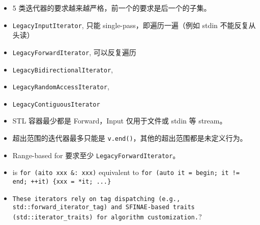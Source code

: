 
\begin{itemize}
\item 5 类迭代器的要求越来越严格，前一个的要求是后一个的子集。
\item \verb`LegacyInputIterator`, 只能 single-pass，即遍历一遍（例如 stdin 不能反复从头读）
\item \verb`LegacyForwardIterator`, 可以反复遍历
\item \verb`LegacyBidirectionalIterator`,
\item \verb`LegacyRandomAccessIterator`,
\item \verb`LegacyContiguousIterator`
\item STL 容器最少都是 Forward，Input 仅用于文件或 stdin 等 stream。
\item 超出范围的迭代器最多只能是 \verb`v.end()`，其他的超出范围都是未定义行为。
\item Range-based for 要求至少 \verb`LegacyForwardIterator`。
\item is \verb`for (aito xxx &: xxx)` equivalent to \verb`for (auto it = begin; it != end; ++it) {xxx = *it; ...}`
\item \verb`These iterators rely on tag dispatching (e.g., std::forward_iterator_tag) and SFINAE-based traits (std::iterator_traits) for algorithm customization.`?
\end{itemize}

